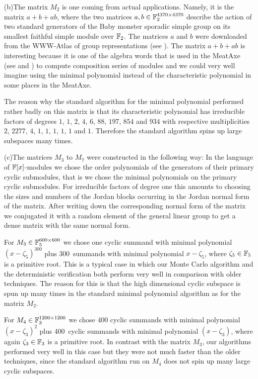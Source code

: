 (b)\quad The matrix $M_2$ is one coming from actual applications. Namely, it is
the matrix $a+b+ab$, where the two matrices $a,b \in \mathbb{F}_2^{4370 \times
4370}$ describe the action of two standard generators of the Baby monster
sporadic simple group on its smallest faithful simple module over $\mathbb{F}_2$.
The matrices $a$ and $b$ were downloaded from the WWW-Atlas of group
%
representations (see \cite{WWWAtlas}). The matrix $a+b+ab$ is
interesting because it is one of the algebra words that is used
in the {\sc MeatAxe} (see \cite{MeatAxeRP} and \cite{MeatAxeHoltRees})
to compute composition series of modules and
we could very well imagine using the minimal polynomial instead of
the characteristic polynomial in some places in the {\sc MeatAxe}.

The reason why the standard algorithm for the minimal polynomial
performed rather badly on this matrix is that its characteristic polynomial
has irreducible factors of degrees $1$, $1$, $2$, $4$, $6$, $88$,
$197$, $854$ and $934$ with respective multiplicities
$2$, $2277$, $4$, $1$, $1$, $1$, $1$, $1$ and $1$.
Therefore the standard algorithm spins up large subspaces
many times.

(c)\quad The matrices $M_3$ to $M_7$ were constructed in the following way:
In the language of $\mathbb{F}[x]$-modules we chose the order polynomials of
the generators of their primary cyclic submodules, that is we chose the
minimal polynomials on the primary cyclic submodules. For irreducible factors
of degree one this amounts to choosing the sizes and numbers of the
Jordan blocks occurring in the Jordan normal form of the matrix.
After writing down the corresponding normal form of the matrix we
conjugated it with a random element of the general linear group to
get a dense matrix with the same normal form.

For $M_3 \in \mathbb{F}_5^{600 \times 600}$ we chose one cyclic summand with
minimal polynomial $(x-\zeta_5)^{300}$ plus 300~summands with minimal
polynomial $x-\zeta_5$, where $\zeta_5 \in \mathbb{F}_5$ is a primitive root.
This is a typical case in which our Monte Carlo algorithm and
the deterministic verification both perform very well in comparison
%
with older techniques. The reason for this is that the high dimensional
cyclic subspace is spun up many times in the standard minimal polynomial
algorithm as for the matrix $M_2$.

\enlargethispage{-1\baselineskip}
For $M_4 \in \mathbb{F}_3^{1200 \times 1200}$ we chose 400 cyclic summands with
minimal polynomial $(x-\zeta_3)^2$ plus 400~cyclic summands with
minimal polynomial $(x-\zeta_3)$, where again $\zeta_3 \in \mathbb{F}_3$ is
a primitive root. In contrast with the matrix $M_3$,  our algorithms 
performed very well in this case but they were not
much faster than the older techniques, since the standard algorithm
run on $M_4$ does not spin up many large cyclic subspaces.


